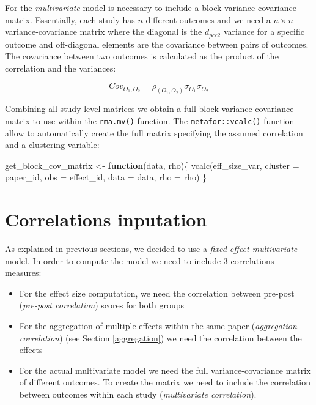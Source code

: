 \documentclass[
]{article}
\newenvironment{Shaded}{\begin{snugshade}}{\end{snugshade}}
\newcommand{\AttributeTok}[1]{\textcolor[rgb]{0.77,0.63,0.00}{#1}}
\newcommand{\ControlFlowTok}[1]{\textcolor[rgb]{0.13,0.29,0.53}{\textbf{#1}}}
\newcommand{\FunctionTok}[1]{\textcolor[rgb]{0.00,0.00,0.00}{#1}}
\newcommand{\NormalTok}[1]{#1}
\newcommand{\OtherTok}[1]{\textcolor[rgb]{0.56,0.35,0.01}{#1}}
\providecommand{\tightlist}{%
  \setlength{\itemsep}{0pt}\setlength{\parskip}{0pt}}
\begin{document}
For the \emph{multivariate} model is necessary to include a block variance-covariance matrix. Essentially, each study has \(n\) different outcomes and we need a \(n \times n\) variance-covariance matrix where the diagonal is the \(d_{pcc2}\) variance for a specific outcome and off-diagonal elements are the covariance between pairs of outcomes. The covariance between two outcomes is calculated as the product of the correlation and the variances:

\begin{equation} 
  Cov_{O_1,O_2} = \rho_{(O_1,O_2)}\sigma_{O_1}\sigma_{O_2}
  \label{eq:vcov}
\end{equation}

Combining all study-level matrices we obtain a full block-variance-covariance matrix to use within the \texttt{rma.mv()} function. The \texttt{metafor::vcalc()} function allow to automatically create the full matrix specifying the assumed correlation and a clustering variable:

\begin{Shaded}
\begin{Highlighting}[]
\NormalTok{get\_block\_cov\_matrix }\OtherTok{\textless{}{-}} \ControlFlowTok{function}\NormalTok{(data, rho)\{}
    \FunctionTok{vcalc}\NormalTok{(eff\_size\_var, }\AttributeTok{cluster =}\NormalTok{ paper\_id, }\AttributeTok{obs =}\NormalTok{ effect\_id, }\AttributeTok{data =}\NormalTok{ data, }\AttributeTok{rho =}\NormalTok{ rho)}
\NormalTok{\}}
\end{Highlighting}
\end{Shaded}

\hypertarget{correlations}{%
\section{Correlations inputation}\label{correlations}}

As explained in previous sections, we decided to use a \emph{fixed-effect multivariate} model. In order to compute the model we need to include 3 correlations measures:

\begin{itemize}
\tightlist
\item
  For the effect size computation, we need the correlation between pre-post (\emph{pre-post correlation}) scores for both groups
\item
  For the aggregation of multiple effects within the same paper (\emph{aggregation correlation}) (see Section \ref{aggregation}) we need the correlation between the effects
\item
  For the actual multivariate model we need the full variance-covariance matrix of different outcomes. To create the matrix we need to include the correlation between outcomes within each study (\emph{multivariate correlation}).
\end{itemize}
\end{document}
